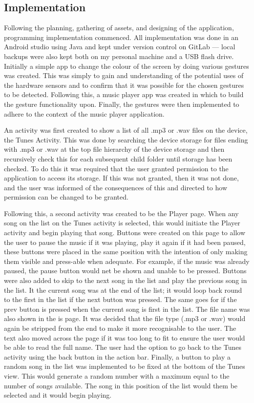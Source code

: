 \documentclass{l4proj}
\begin{document}
\subsection{Implementation}

Following the planning, gathering of assets, and designing of the application, programming implementation commenced. All implementation was done in an Android studio using Java and kept under version control on GitLab --- local backups were also kept both on my personal machine and a USB flash drive. Initially a simple app to change the colour of the screen by doing various gestures was created. This was simply to gain and understanding of the potential uses of the hardware sensors and to confirm that it was possible for the chosen gestures to be detected. Following this, a music player app was created in which to build the gesture functionality upon. Finally, the gestures were then implemented to adhere to the context of the music player application.

An activity was first created to show a list of all .mp3 or .wav files on the device, the Tunes Activity. This was done by searching the device storage for files ending with .mp3 or .wav at the top file hierarchy of the device storage and then recursively check this for each subsequent child folder until storage has been checked. To do this it was required that the user granted permission to the application to access its storage. If this was not granted, then it was not done, and the user was informed of the consequences of this and directed to how permission can be changed to be granted.

Following this, a second activity was created to be the Player page. When any song on the list on the Tunes activity is selected, this would initiate the Player activity and begin playing that song. Buttons were created on this page to allow the user to pause the music if it was playing, play it again if it had been paused, these buttons were placed in the same position with the intention of only making them visible and press-able when adequate. For example, if the music was already paused, the pause button would net be shown and unable to be pressed. Buttons were also added to skip to the next song in the list and play the previous song in the list. It the current song was at the end of the list; it would loop back round to the first in the list if the next button was pressed. The same goes for if the prev button is pressed when the current song is first in the list. The file name was also shown in the is page. It was decided that the file type (.mp3 or .wav) would again be stripped from the end to make it more recognisable to the user. The text also moved across the page if it was too long to fit to ensure the user would be able to read the full name. The user had the option to go back to the Tunes activity using the back button in the action bar. Finally, a button to play a random song in the list was implemented to be fixed at the bottom of the Tunes view. This would generate a random number with a maximum equal to the number of songs available. The song in this position of the list would them be selected and it would begin playing.
\end{document}
